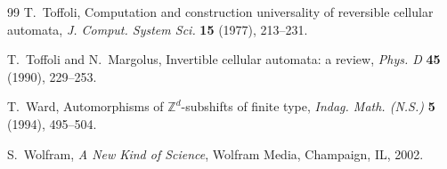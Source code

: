 \documentclass[11pt]{amsart}
\theoremstyle{definition}
\theoremstyle{remark}
\theoremstyle{plain}
\begin{document}
\begin{thebibliography}{99}
 T.~Toffoli, Computation and construction universality of reversible cellular automata, \emph{J. Comput. System Sci.} \textbf{15} (1977), 213--231.

 T.~Toffoli and N.~Margolus, Invertible cellular automata: a review, \emph{Phys. D} \textbf{45} (1990), 229--253.

 T.~Ward, Automorphisms of $\mathbb{Z}^d$-subshifts of finite type, \emph{Indag. Math. (N.S.)} \textbf{5} (1994), 495--504.

 S.~Wolfram, \emph{A New Kind of Science}, Wolfram Media, Champaign, IL, 2002.

\end{thebibliography}
\end{document}
